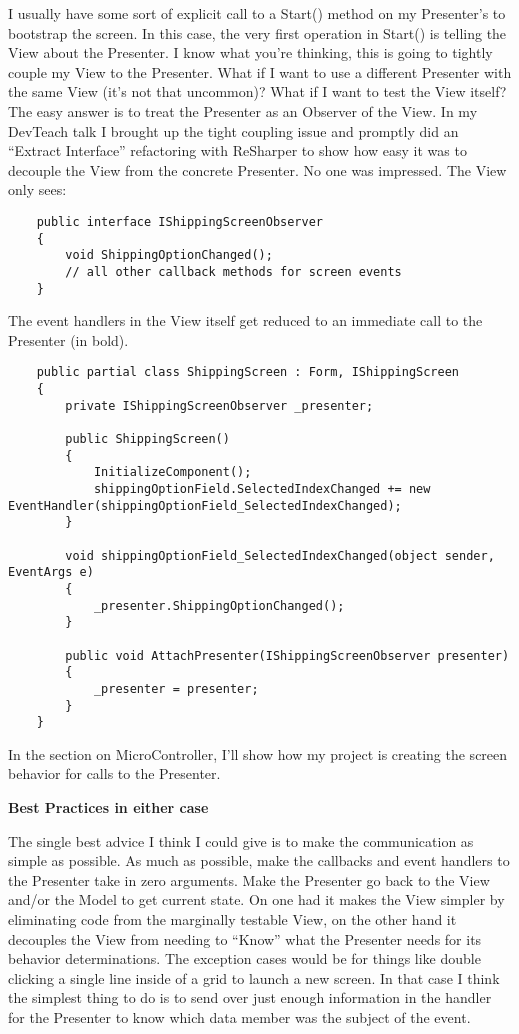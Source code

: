 \documentclass{article}
\begin{document}
{I usually have some sort of explicit call to a Start() method on my Presenter's to bootstrap the screen.  In this case, the very first operation in Start() is telling the View about the Presenter.  I know what you're thinking, this is going to tightly couple my View to the Presenter.  What if I want to use a different Presenter with the same View (it's not that uncommon)?  What if I want to test the View itself?  The easy answer is to treat the Presenter as an Observer of the View.  In my DevTeach talk I brought up the tight coupling issue and promptly did an “Extract Interface” refactoring with ReSharper to show how easy it was to decouple the View from the concrete Presenter.  No one was impressed.  The View only sees:
 \begin{lstlisting}
    public interface IShippingScreenObserver
    {
        void ShippingOptionChanged();
        // all other callback methods for screen events
    }
 \end{lstlisting}

The event handlers in the View itself get reduced to an immediate call to the Presenter (in bold).
 \begin{lstlisting}
    public partial class ShippingScreen : Form, IShippingScreen
    {
        private IShippingScreenObserver _presenter; 

        public ShippingScreen()
        {
            InitializeComponent();
            shippingOptionField.SelectedIndexChanged += new EventHandler(shippingOptionField_SelectedIndexChanged);
        } 

        void shippingOptionField_SelectedIndexChanged(object sender, EventArgs e)
        {
            _presenter.ShippingOptionChanged();
        }

        public void AttachPresenter(IShippingScreenObserver presenter)
        {
            _presenter = presenter;
        }
    }
 \end{lstlisting}

In the section on MicroController, I'll show how my project is creating the screen behavior for calls to the Presenter.

 
\Large {\textbf{Best Practices in either case}}

The single best advice I think I could give is to make the communication as simple as possible.  As much as possible, make the callbacks and event handlers to the Presenter take in zero arguments.  Make the Presenter go back to the View and/or the Model to get current state.  On one had it makes the View simpler by eliminating code from the marginally testable View, on the other hand it decouples the View from needing to “Know” what the Presenter needs for its behavior determinations.  The exception cases would be for things like double clicking a single line inside of a grid to launch a new screen.  In that case I think the simplest thing to do is to send over just enough information in the handler for the Presenter to know which data member was the subject of the event.

}
\end{document}
